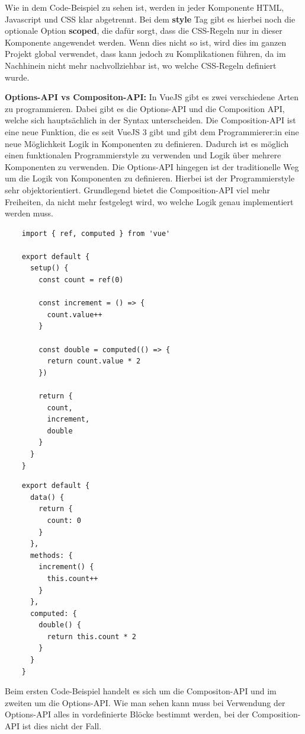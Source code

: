 Wie in dem Code-Beispiel zu sehen ist, werden in jeder Komponente HTML, Javascript und CSS klar abgetrennt. Bei dem \textbf{style} Tag gibt es hierbei noch die optionale Option \textbf{scoped}, die dafür sorgt, dass die CSS-Regeln nur in dieser Komponente angewendet werden. Wenn dies nicht so ist, wird dies im ganzen Projekt global verwendet, dass kann jedoch zu Komplikationen führen, da im Nachhinein nicht mehr nachvollziehbar ist, wo welche CSS-Regeln definiert wurde.

\cite{frontend_web_vuejs_components2}

\textbf{Options-API vs Compositon-API:}
\newline
In VueJS gibt es zwei verschiedene Arten zu programmieren. Dabei gibt es die Options-API und die Composition API, welche sich hauptsächlich in der Syntax unterscheiden. Die Composition-API ist eine neue Funktion, die es seit VueJS 3 gibt und gibt dem Programmierer:in eine neue Möglichkeit Logik in Komponenten zu definieren. Dadurch ist es möglich einen funktionalen Programmierstyle zu verwenden und Logik über mehrere Komponenten zu verwenden. Die Options-API hingegen ist der traditionelle Weg um die Logik von Komponenten zu definieren. Hierbei ist der Programmierstyle sehr objektorientiert. Grundlegend bietet die Composition-API viel mehr Freiheiten, da nicht mehr festgelegt wird, wo welche Logik genau implementiert werden muss.

\begin{lstlisting}
    import { ref, computed } from 'vue'

    export default {
      setup() {
        const count = ref(0)
    
        const increment = () => {
          count.value++
        }
    
        const double = computed(() => {
          return count.value * 2
        })
    
        return {
          count,
          increment,
          double
        }
      }
    }
\end{lstlisting}
\newline
\begin{lstlisting}
    export default {
      data() {
        return {
          count: 0
        }
      },
      methods: {
        increment() {
          this.count++
        }
      },
      computed: {
        double() {
          return this.count * 2
        }
      }
    }
\end{lstlisting}

Beim ersten Code-Beispiel handelt es sich um die Compositon-API und im zweiten um die Options-API. Wie man sehen kann muss bei Verwendung der Options-API alles in vordefinierte Blöcke bestimmt werden, bei der Composition-API ist dies nicht der Fall.

